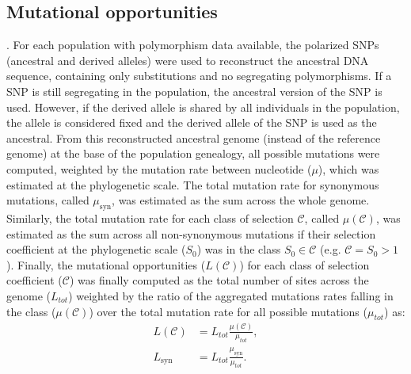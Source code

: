 \documentclass{article}
\newcommand{\Sphy}{S_{0}}
\newcommand{\Sphyclass}{\mathcal{C}}
\newcommand{\divAdv}{ \Sphy > 1}
\begin{document}
    \subsection{Mutational opportunities}
    \label{subsec:nunber-of-sites}.
    For each population with polymorphism data available, the polarized SNPs (ancestral and derived alleles) were used to reconstruct the ancestral DNA sequence, containing only substitutions and no segregating polymorphisms.
    If a SNP is still segregating in the population, the ancestral version of the SNP is used.
    However, if the derived allele is shared by all individuals in the population, the allele is considered fixed and the derived allele of the SNP is used as the ancestral.
    From this reconstructed ancestral genome (instead of the reference genome) at the base of the population genealogy, all possible mutations were computed, weighted by the mutation rate between nucleotide ($\mu$), which was estimated at the phylogenetic scale.
    The total mutation rate for synonymous mutations, called $\mu_{\textrm{syn}}$, was estimated as the sum across the whole genome.
    Similarly, the total mutation rate for each class of selection $\Sphyclass$, called $\mu\left( \Sphyclass \right)$, was estimated as the sum across all non-synonymous mutations if their selection coefficient at the phylogenetic scale ($\Sphy$) was in the class $\Sphy \in \Sphyclass$ (e.g. $\Sphyclass = \divAdv$).
    Finally, the mutational opportunities ($L \left( \Sphyclass \right)$) for each class of selection coefficient ($\Sphyclass$) was finally computed as the total number of sites across the genome ($L_{tot}$) weighted by the ratio of the aggregated mutations rates falling in the class ($\mu\left( \Sphyclass \right)$) over the total mutation rate for all possible mutations ($\mu_{tot}$) as:
    \begin{align}
        L \left( \Sphyclass \right) &= L_{tot} \frac{\mu\left( \Sphyclass \right)}{\mu_{tot}}, \\
        L_{\textrm{syn}} &= L_{tot} \frac{\mu_{\textrm{syn}}}{\mu_{tot}}.
    \end{align}
\end{document}
